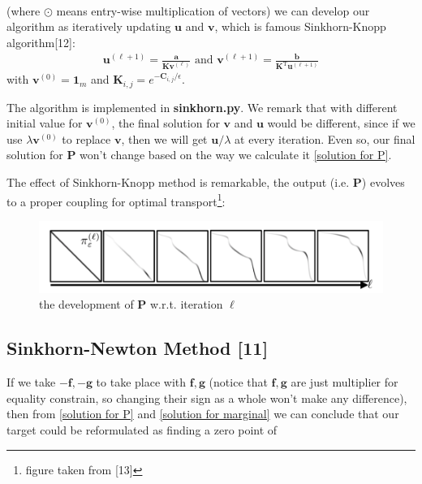 \documentclass{article}
\begin{document}
\begin{large}
\begin{align}
\label{solution for marginal}
\end{align}
(where $\odot$ means entry-wise multiplication of vectors) we can develop our algorithm as iteratively updating $\mathbf { u }$ and $\mathbf { v }$, which is famous Sinkhorn-Knopp algorithm[12]:
\begin{align}
\mathbf { u } ^ { ( \ell + 1 ) }  { = } \frac { \mathbf { a } } { \mathbf { K } \mathbf { v } ^ { ( \ell ) } } \text { and } \mathbf { v } ^ { ( \ell + 1 ) } { = } \frac { \mathbf { b } } { \mathbf { K } ^ { \mathrm { T } } \mathbf { u } ^ { ( \ell + 1 ) } }
\end{align}
with $\mathbf { v } ^ { ( 0 ) } = \mathbf { 1 } _ { m }$ and $\mathbf { K } _ { i , j } = e^{-\mathbf{C}_{i,j}/\epsilon}$.

The algorithm is implemented in \textbf{sinkhorn.py}. We remark that with different initial value for $\mathbf { v } ^ { ( 0 ) }$, the final solution for $\mathbf { v } $ and $\mathbf { u } $ would be different, since if we use $\lambda\mathbf { v } ^{(0)}$ to replace $\mathbf { v } $, then we will get  $\mathbf { u }/\lambda $ at every iteration. Even so, our final solution for $\mathbf{P}$ won't change based on the way we calculate it \ref{solution for P}.

The effect of Sinkhorn-Knopp method is remarkable, the output (i.e.  $\mathbf{P}$) evolves to a proper coupling for optimal transport\footnote{figure taken from [13]}:
\begin{figure}[H] %
   \centering
   \includegraphics[width= 5in]{sinkhorn} 
   \caption{the development of $\mathbf{P}$ w.r.t. iteration $\ell$}
   \label{fig:sinkhorn}
\end{figure}

\subsection{Sinkhorn-Newton Method [11]}
If we take $-\mathbf{f}, -\mathbf{g}$ to take place with $\mathbf{f}, \mathbf{g}$ (notice that $\mathbf{f}, \mathbf{g}$ are just multiplier for equality constrain, so changing their sign as a whole won't make any difference), then from \ref{solution for P} and \ref{solution for marginal} we can conclude that our target could be reformulated as finding a zero point of


\end{large}
\end{document}
